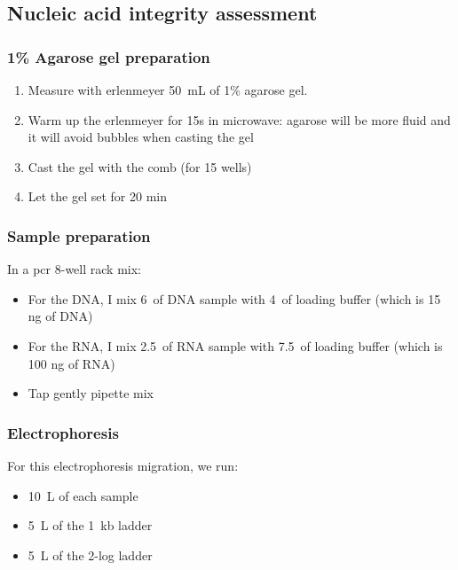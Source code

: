 \subsection{Nucleic acid integrity assessment}
\label{task:20180321_cj0}


\subsubsection{1\% Agarose gel preparation}

\begin{enumerate}
\item Measure with erlenmeyer 50~mL of 1\% agarose gel.
\item Warm up the erlenmeyer for 15s in microwave: agarose will be more fluid and it will avoid bubbles when casting the gel
\item Cast the gel with the comb (for 15 wells)
\item Let the gel set for 20 min
\end{enumerate}


\subsubsection{Sample preparation}

In a \gls{pcr} 8-well rack mix:
\begin{itemize}
\item For the DNA, I mix 6~\uL of DNA sample with 4~\uL of loading buffer (which is 15 ng of DNA)
\item For the RNA, I mix 2.5~\uL of RNA sample with 7.5~\uL of loading buffer (which is 100 ng of RNA)
\item Tap gently pipette mix
\end{itemize}

\subsubsection{Electrophoresis}

For this electrophoresis migration, we run:
\begin{itemize}
\item 10~\textmu L of each sample 
\item 5~\textmu L of the 1~kb ladder
\item 5~\textmu L of the 2-log ladder
\end{itemize}

